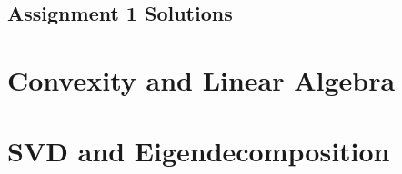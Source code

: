 \documentclass[12pt]{article}
\begin{document}
\subsection*{Assignment 1 Solutions}

\section{Convexity and Linear Algebra}


\section{SVD and Eigendecomposition}



\end{document}
